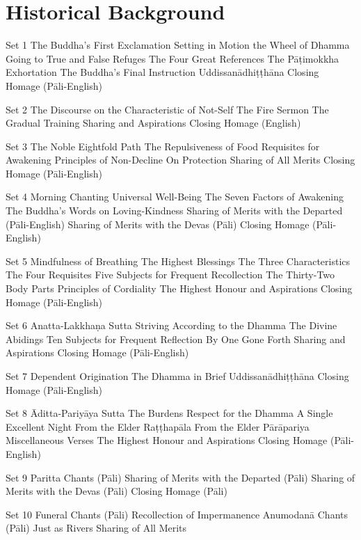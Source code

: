 \section{Historical Background}

Set 1
The Buddha’s First Exclamation
Setting in Motion the Wheel of Dhamma
Going to True and False Refuges
The Four Great References
The Pāṭimokkha Exhortation
The Buddha's Final Instruction
Uddissanādhiṭṭhāna
Closing Homage (Pāli-English)

Set 2
The Discourse on the Characteristic of Not-Self
The Fire Sermon
The Gradual Training
Sharing and Aspirations
Closing Homage (English)

Set 3
The Noble Eightfold Path
The Repulsiveness of Food
Requisites for Awakening
Principles of Non-Decline
On Protection
Sharing of All Merits
Closing Homage (Pāli-English)

Set 4
Morning Chanting
Universal Well-Being
The Seven Factors of Awakening
The Buddha’s Words on Loving-Kindness
Sharing of Merits with the Departed (Pāli-English)
Sharing of Merits with the Devas (Pāli)
Closing Homage (Pāli-English)

Set 5
Mindfulness of Breathing
The Highest Blessings
The Three Characteristics
The Four Requisites
Five Subjects for Frequent Recollection
The Thirty-Two Body Parts
Principles of Cordiality
The Highest Honour and Aspirations
Closing Homage (Pāli-English)

Set 6
Anatta-Lakkhaṇa Sutta
Striving According to the Dhamma
The Divine Abidings
Ten Subjects for Frequent Reflection By One Gone Forth
Sharing and Aspirations
Closing Homage (Pāli-English)

Set 7
Dependent Origination
The Dhamma in Brief
Uddissanādhiṭṭhāna
Closing Homage (Pāli-English)

Set 8
Āditta-Pariyāya Sutta
The Burdens
Respect for the Dhamma
A Single Excellent Night
From the Elder Raṭṭhapāla
From the Elder Pārāpariya
Miscellaneous Verses
The Highest Honour and Aspirations
Closing Homage (Pāli-English)

Set 9
Paritta Chants (Pāli)
Sharing of Merits with the Departed (Pāli)
Sharing of Merits with the Devas (Pāli)
Closing Homage (Pāli)

Set 10
Funeral Chants (Pāli)
Recollection of Impermanence
Anumodanā Chants (Pāli)
Just as Rivers
Sharing of All Merits
